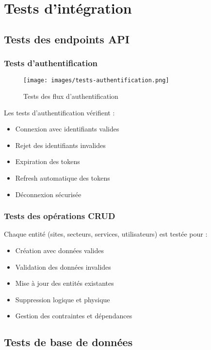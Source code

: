 \section{Tests d'intégration}
\subsection{Tests des endpoints API}
\subsubsection{Tests d'authentification}
\begin{figure}[h]
\centering
\texttt{[image: images/tests-authentification.png]}
\caption{Tests des flux d'authentification}
\label{fig:tests-authentification}
\end{figure}

Les tests d'authentification vérifient :
\begin{itemize}
    \item Connexion avec identifiants valides
    \item Rejet des identifiants invalides
    \item Expiration des tokens
    \item Refresh automatique des tokens
    \item Déconnexion sécurisée
\end{itemize}

\subsubsection{Tests des opérations CRUD}
Chaque entité (sites, secteurs, services, utilisateurs) est testée pour :
\begin{itemize}
    \item Création avec données valides
    \item Validation des données invalides
    \item Mise à jour des entités existantes
    \item Suppression logique et physique
    \item Gestion des contraintes et dépendances
\end{itemize}

\subsection{Tests de base de données}
